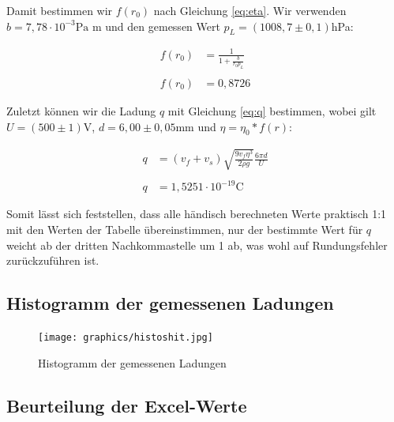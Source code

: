 \documentclass{article}
\begin{document}
Damit bestimmen wir $f(r_0)$ nach Gleichung \ref{eq:eta}. Wir verwenden $b=7,78 \cdot 10^{-3}\text{Pa m}$ und den gemessen Wert $p_L = (1008,7 \pm 0,1)$hPa:

\begin{equation}
    \begin{split}
        f(r_0) &= \frac{1}{1+\frac{b}{r_0p_L}} \\ \\%
        f(r_0) &= 0,8726
    \end{split}
\end{equation}

Zuletzt können wir die Ladung $q$ mit Gleichung \ref{eq:q} bestimmen, wobei gilt $U = (500 \pm 1)$V, $d = 6,00 \pm 0,05$mm und $\eta = \eta_0 * f(r)$:

\begin{equation}
\begin{split}
    q &= (v_f + v_s) \sqrt{\frac{9v_f \eta^3}{2 \rho g}} \frac{6 \pi d}{U} \\ \\
    q &= 1,5251 \cdot 10^{-19} \text{C}    
\end{split}
\end{equation}

Somit lässt sich feststellen, dass alle händisch berechneten Werte praktisch 1:1 mit den Werten der Tabelle übereinstimmen, nur der bestimmte Wert für $q$ weicht ab der dritten Nachkommastelle um 1 ab, was wohl auf Rundungsfehler zurückzuführen ist.

\newpage

\subsection{Histogramm der gemessenen Ladungen}

\begin{figure} [!h]
    \centering
    \texttt{[image: graphics/histoshit.jpg]}
    \caption{Histogramm der gemessenen Ladungen}
    \label{fig:histoshit}
\end{figure}

\newpage

\subsection{Beurteilung der Excel-Werte}
\end{document}
